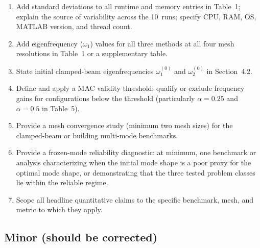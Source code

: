 \documentclass[11pt,a4paper]{article}
\begin{document}
\begin{enumerate}[leftmargin=*, label=\textbf{MR\arabic*.}]

\item Add standard deviations to all runtime and memory entries in
  Table~1; explain the source of variability across the 10~runs; specify
  CPU, RAM, OS, MATLAB version, and thread count.

\item Add eigenfrequency ($\omega_1$) values for all three methods at all
  four mesh resolutions in Table~1 or a supplementary table.

\item State initial clamped-beam eigenfrequencies $\omega_1^{(0)}$ and
  $\omega_2^{(0)}$ in Section~4.2.

\item Define and apply a MAC validity threshold; qualify or exclude frequency
  gains for configurations below the threshold (particularly
  $\alpha=0.25$ and $\alpha=0.5$ in Table~5).

\item Provide a mesh convergence study (minimum two mesh sizes) for the
  clamped-beam or building multi-mode benchmarks.

\item Provide a frozen-mode reliability diagnostic: at minimum, one
  benchmark or analysis characterizing when the initial mode shape is
  a poor proxy for the optimal mode shape, or demonstrating that the
  three tested problem classes lie within the reliable regime.

\item Scope all headline quantitative claims to the specific benchmark,
  mesh, and metric to which they apply.

\end{enumerate}

\subsection*{Minor (should be corrected)}
\end{document}
